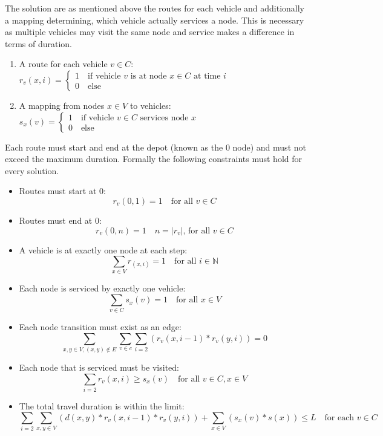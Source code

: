 \documentclass[12pt, letterpaper]{article}
\begin{document}
The solution are as mentioned above the routes for each vehicle and additionally a mapping determining, which vehicle actually services a node. This is necessary as multiple vehicles may visit the same node and service makes a difference in terms of duration.
\begin{enumerate}
	\item A route for each vehicle $v \in C$: \\
		$r_v(x,i) =
		\begin{cases}
			1	\quad \text{if vehicle } v \text{ is at node } x \in C \text{ at time } i\\
			0	\quad \text{else}
		\end{cases}
		$
	\item A mapping from nodes $x \in V$ to vehicles: \\
		$s_x(v) =
		\begin{cases}
			1	\quad \text{if vehicle } v \in C \text{ services node } x\\
			0	\quad \text{else}
		\end{cases}
		$
\end{enumerate}

Each route must start and end at the depot (known as the 0 node) and must not exceed the maximum duration. Formally the following constraints must hold for every solution.
\begin{itemize}
	\item Routes must start at 0:\\
		$$r_v(0,1) = 1 \quad \text{for all } v \in C$$
	\item Routes must end at 0:\\
		$$r_v(0,n) = 1 \quad n = |r_v| \text{, for all } v \in C$$
	\item A vehicle is at exactly one node at each step: \\
		$$\sum_{x \in V} r_(x,i) = 1 \quad \text{for all } i \in \mathbb{N}$$
	\item Each node is serviced by exactly one vehicle:\\
		$$\sum_{v \in C} s_x(v) = 1 \quad \text{for all } x \in V$$
	\item Each node transition must exist as an edge: \\
		$$\sum_{x,y \in V, (x,y) \not\in E} \sum_{v \in c} \sum_{i=2} (r_v(x,i-1) * r_v(y,i)) = 0 $$
	\item Each node that is serviced must be visited: \\
		$$\sum_{i=2} r_v(x,i) \geq s_x(v) \quad \text{for all } v \in C, x \in V $$
	\item The total travel duration is within the limit: \\
		$$\sum_{i=2} \sum_{x,y \in V} (d(x,y) * r_v(x,i-1) * r_v(y,i)) + \sum_{x \in V}(s_x(v) * s(x)) \leq L \quad \text{for each } v \in C$$

\end{itemize}
\end{document}
